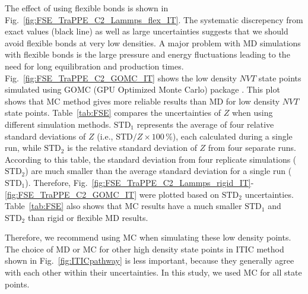 \documentclass[5p,times]{elsarticle}
\begin{document}
The effect of using flexible bonds is shown in Fig.~\ref{fig:FSE_TraPPE_C2_Lammps_flex_IT}. The systematic discrepency from exact values (black line) as well as large uncertainties suggests that we should avoid flexible bonds at very low densities. A major problem with MD simulations with flexible bonds is the large pressure and energy fluctuations leading to the need for long equilibration and production times.
Fig.~\ref{fig:FSE_TraPPE_C2_GOMC_IT} shows the low density $NVT$ state points simulated using GOMC (GPU Optimized Monte Carlo) package \cite{Mick2013}. This plot shows that MC method gives more reliable results than MD for low density $NVT$ state points. Table~\ref{tab:FSE} compares the uncertainties of $Z$ when using different simulation methods. $\mathrm{STD}_1$ represents the average of four relative standard deviations of $Z$ (i.e., $\mathrm{STD}/Z\times100 \, \%$), each calculated during a single run, while $\mathrm{STD}_2$ is the relative standard deviation of $Z$ from four separate runs. According to this table, the standard deviation from four replicate simulations ($\mathrm{STD}_2$) are much smaller than the average standard deviation for a single run ($\mathrm{STD}_1$). Therefore, Fig.~\ref{fig:FSE_TraPPE_C2_Lammps_rigid_IT}-\ref{fig:FSE_TraPPE_C2_GOMC_IT} were plotted based on $\mathrm{STD}_2$ uncertainties. Table~\ref{tab:FSE} also shows that MC results have a much smaller $\mathrm{STD}_1$ and $\mathrm{STD}_2$ than rigid or flexible MD results. 

Therefore, we recommend using MC when simulating these low density points. The choice of MD or MC for other high density state points in ITIC method shown in Fig.~\ref{fig:ITICpathway} is less important, because they generally agree with each other within their uncertainties. In this study, we used MC for all state points. 
\end{document}
